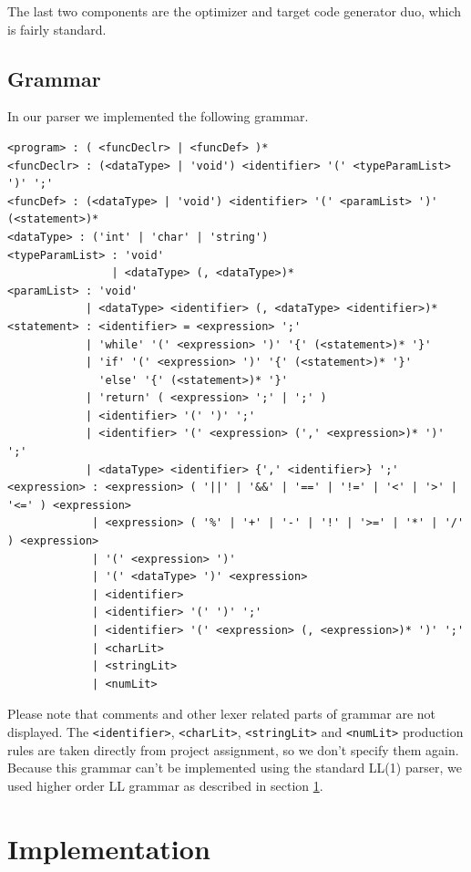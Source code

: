 \documentclass[titlepage]{article}
\begin{document}
The last two components are the optimizer and target code generator duo, which is fairly
standard.

\subsection{Grammar}
In our parser we implemented the following grammar.

\begin{verbatim}
<program> : ( <funcDeclr> | <funcDef> )*
<funcDeclr> : (<dataType> | 'void') <identifier> '(' <typeParamList> ')' ';'
<funcDef> : (<dataType> | 'void') <identifier> '(' <paramList> ')' (<statement>)*
<dataType> : ('int' | 'char' | 'string')
<typeParamList> : 'void'
                | <dataType> (, <dataType>)*
<paramList> : 'void'
            | <dataType> <identifier> (, <dataType> <identifier>)*
<statement> : <identifier> = <expression> ';'
            | 'while' '(' <expression> ')' '{' (<statement>)* '}'
            | 'if' '(' <expression> ')' '{' (<statement>)* '}'
              'else' '{' (<statement>)* '}'
            | 'return' ( <expression> ';' | ';' )
            | <identifier> '(' ')' ';'
            | <identifier> '(' <expression> (',' <expression>)* ')' ';'
            | <dataType> <identifier> {',' <identifier>} ';'
<expression> : <expression> ( '||' | '&&' | '==' | '!=' | '<' | '>' | '<=' ) <expression>
             | <expression> ( '%' | '+' | '-' | '!' | '>=' | '*' | '/' ) <expression>
             | '(' <expression> ')'
             | '(' <dataType> ')' <expression>
             | <identifier>
             | <identifier> '(' ')' ';'
             | <identifier> '(' <expression> (, <expression>)* ')' ';'
             | <charLit>
             | <stringLit>
             | <numLit>
\end{verbatim}

Please note that comments and other lexer related parts of grammar are not displayed.
The \texttt{<identifier>}, \texttt{<charLit>}, \texttt{<stringLit>} and \texttt{<numLit>}
production rules are taken directly from project assignment, so we don't specify them
again. Because this grammar can't be implemented using the standard LL(1) parser, we
used higher order LL grammar as described in section \ref{sec:implementation}.

\section{Implementation}
\label{sec:implementation}
\end{document}
